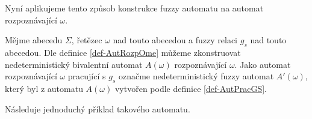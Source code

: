 \documentclass[a4paper,10pt]{article}
\begin{document}
Nyní aplikujeme tento způsob konstrukce fuzzy automatu na automat rozpoznávající $\omega$.

\begin{definition}
 Mějme abecedu $\Sigma$, řetězec $\omega$ nad touto abecedou a fuzzy relaci $g_s$ nad touto abecedou. Dle definice \ref{def-AutRozpOme} můžeme zkonstruovat nedeterministický bivalentní automat $A(\omega)$ rozpoznávající $\omega$. Jako automat rozpoznávající $\omega$ pracující s $g_s$ označme nedeterministický fuzzy automat $A'(\omega)$, který byl z automatu $A(\omega)$ vytvořen podle definice \ref{def-AutPracGS}.
\end{definition}


Následuje jednoduchý příklad takového automatu.
\end{document}
